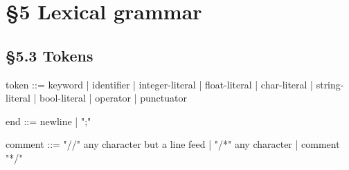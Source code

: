 %
%
%
%


\section*{§5 Lexical grammar}

\subsection*{§5.3 Tokens}
\label{gram:token}
\begin{grammar}
token ::=
    keyword
  | identifier
  | integer-literal
  | float-literal
  | char-literal
  | string-literal
  | bool-literal
  | operator
  | punctuator

end ::= newline | ";"           %

comment ::=
    "//" { any character but a line feed }
  | "/*" { any character | comment } "*/"           %
\end{grammar}

